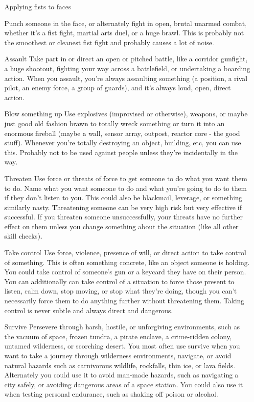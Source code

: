 Applying fists to faces




Punch someone in the face, or alternately fight in open, brutal unarmed combat, whether it’s a fist
fight, martial arts duel, or a huge brawl. This is probably not the smoothest or cleanest fist fight
and probably causes a lot of noise.

Assault
Take part in or direct an open or pitched battle, like a corridor gunfight, a huge shootout, fighting
your way across a battlefield, or undertaking a boarding action. When you assault, you’re always
assaulting something (a position, a rival pilot, an enemy force, a group of guards), and it’s always
loud, open, direct action.

Blow something up
Use explosives (improvised or otherwise), weapons, or maybe just good old fashion brawn to
totally wreck something or turn it into an enormous fireball (maybe a wall, sensor array, outpost,
reactor core - the good stuff). Whenever you’re totally destroying an object, building, etc, you can
use this. Probably not to be used against people unless they’re incidentally in the way.

Threaten
Use force or threats of force to get someone to do what you want them to do. Name what you
want someone to do and what you’re going to do to them if they don’t listen to you. This could
also be blackmail, leverage, or something similarly nasty. Threatening someone can be very high
risk but very effective if successful. If you threaten someone unsuccessfully, your threats have no
further effect on them unless you change something about the situation (like all other skill checks).

Take control
Use force, violence, presence of will, or direct action to take control of something. This is often
something concrete, like an object someone is holding. You could take control of someone’s gun
or a keycard they have on their person. You can additionally can take control of a situation to force
those present to listen, calm down, stop moving, or stop what they’re doing, though you can’t
necessarily force them to do anything further without threatening them. Taking control is never
subtle and always direct and dangerous.

Survive
Persevere through harsh, hostile, or unforgiving environments, such as the vacuum of space,
frozen tundra, a pirate enclave, a crime-ridden colony, untamed wilderness, or scorching desert.
You most often use survive when you want to take a journey through wilderness environments,
navigate, or avoid natural hazards such as carnivorous wildlife, rockfalls, thin ice, or lava fields.
Alternately you could use it to avoid man-made hazards, such as navigating a city safely, or
avoiding dangerous areas of a space station. You could also use it when testing personal
endurance, such as shaking off poison or alcohol.

